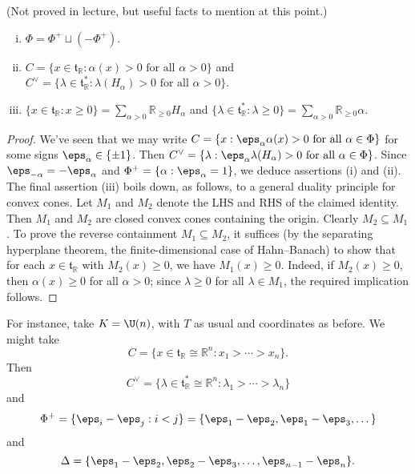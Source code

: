\documentclass[reqno]{amsart} 
\begin{document}
\begin{lemma}
  (Not proved in lecture, but useful facts to mention at this point.)
  \begin{enumerate}
[(i)]
  \item $\Phi = \Phi^+ \sqcup (-\Phi^+)$.
  \item $C = \{x \in \mathfrak{t}_{\mathbb{R}} : \alpha(x) > 0 \text{ for all } \alpha > 0\}$ and $C^\vee = \{\lambda \in \mathfrak{t}_{\mathbb{R}}^* : \lambda(H_\alpha) > 0 \text{ for all } \alpha > 0\}$.
  \item $\{ x \in \mathfrak{t}_{\mathbb{R}} : x \geq 0 \} = \sum_{\alpha > 0} \mathbb{R}_{\geq 0} H_{\alpha}$ and $\{ \lambda \in \mathfrak{t}_{\mathbb{R}}^* : \lambda \geq 0 \} = \sum_{\alpha > 0} \mathbb{R}_{\geq 0} \alpha$.
  \end{enumerate}
\end{lemma}
\begin{proof}
  We've seen that we may write $C = \{x : \eps_\alpha \alpha(x) > 0 \text{ for all } \alpha \in \Phi \}$ for some signs $\eps_\alpha \in \{\pm 1\}$.  Then $C^\vee = \{\lambda : \eps_\alpha \lambda(H_\alpha) > 0 \text{ for all } \alpha \in \Phi \}$.  Since $\eps_{-\alpha} = - \eps_{\alpha}$ and $\Phi^+ = \{\alpha : \eps_\alpha = 1\}$, we deduce assertions (i) and (ii).  The final assertion (iii) boils down, as follows, to a general duality principle for convex cones.  Let $M_1$ and $M_2$ denote the LHS and RHS of the claimed identity.  Then $M_1$ and $M_2$ are closed convex cones containing the origin.  Clearly $M_2 \subseteq M_1$.  To prove the reverse containment $M_1 \subseteq M_2$, it suffices (by the separating hyperplane theorem, the finite-dimensional case of Hahn--Banach) to show that for each $x \in \mathfrak{t}_{\mathbb{R}}$ with $M_2(x) \geq 0$, we have $M_1(x) \geq 0$.  Indeed, if $M_2(x) \geq 0$, then $\alpha(x) \geq 0$ for all $\alpha > 0$; since $\lambda \geq 0$ for all $\lambda \in M_1$, the required implication follows.
\end{proof}


For instance, take $K = \U(n)$, with $T$ as usual and coordinates as before.  We might take
\begin{equation}
  C = \{x \in \mathfrak{t}_{\mathbb{R}} \cong \mathbb{R}^n : x_1
  > \dotsb > x_n\}.
\end{equation}
Then
\begin{equation}\label{eq:}
  C^\vee = \{\lambda \in \mathfrak{t}_{\mathbb{R}}^* \cong
  \mathbb{R}^n:
  \lambda_1 > \dotsb > \lambda_n\}
\end{equation}
and
\begin{equation}
  \Phi^+ = \{\eps_i - \eps_j : i < j\} = \{\eps_1 - \eps_2,
  \eps_1 - \eps_3, \dotsc\}
\end{equation}
and
\begin{equation}\label{eq:}
  \Delta = \{\eps_1 - \eps_2, \eps_2 - \eps_3, \dotsc, \eps_{n-1} - \eps_n\}.
\end{equation}
\end{document}
